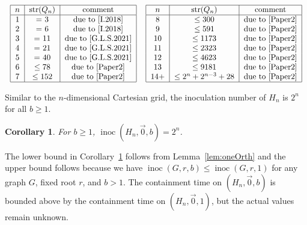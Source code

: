 \documentclass[unknownkeysallowed]{article}
\newtheorem{corollary}[theorem]{Corollary}
\theoremstyle{definition}\newtheorem{strategy}{Strategy}
\theoremstyle{definition}\newtheorem{notation}{Notation}[theorem]
\DeclareMathOperator{\strength}{str}
\DeclareMathOperator{\inoc}{inoc}
\begin{document}
\begin{table}[htbp]
\[ 
\begin{tabular}{cc}\begin{tabular}{|c|c|c|}
\hline
$n$ & $\strength(Q_n)$ & \text{comment} \\
\hline
1 & = 3 & due to \cite{I.2018}\\
2 & = 6 & due to \cite{I.2018} \\
3 & = 11 & due to \cite{G.L.S.2021}\\
4 & = 21 & due to \cite{G.L.S.2021}\\
5 & = 40 & due to \cite{G.L.S.2021}\\
6 & $\leq 78$ & due to \cite{Paper2} \\
7 & $\leq 152$ & due to \cite{Paper2} \\ 
\hline
\end{tabular} 
&
\begin{tabular}{|c|c|c|}
\hline
$n$ & $\strength(Q_n)$ & \text{comment} \\
\hline
8 & $\leq 300$ & due to \cite{Paper2} \\
9 & $\leq 591$ &  due to \cite{Paper2} \\
10 & $\leq 1173$ & due to \cite{Paper2} \\
11 & $\leq 2323$ & due to \cite{Paper2} \\
12 & $\leq 4623$ & due to \cite{Paper2} \\
13 & $\leq 9181$ & due to \cite{Paper2} \\
14+ & $\leq 2^n+2^{n-3}+28$ & due to \cite{Paper2} \\ 
\hline
\end{tabular} 
\end{tabular}
\] 
\caption{Known values and best current upper bounds for $\strength(Q_n)$.}
\label{table:strength}
\end{table}

Similar to the $n$-dimensional Cartesian grid, the inoculation number of $H_n$ is $2^n$ for all $b \geq 1$.

\begin{corollary}\label{cor:b} For $b\geq1$, $\inoc(H_n,\vec{0},b)=2^n$. \end{corollary} 

The lower bound in Corollary~\ref{cor:b} follows from Lemma~\ref{lem:oneOrth} and the upper bound follows because we have $\inoc(G,r,b) \leq \inoc(G,r,1)$ for any graph $G$, fixed root $r$, and $b>1$.  The containment time on $(H_n,\vec{0},b)$ is bounded above by the containment time on $(H_n,\vec{0},1)$, but the actual values remain unknown.
\end{document}
